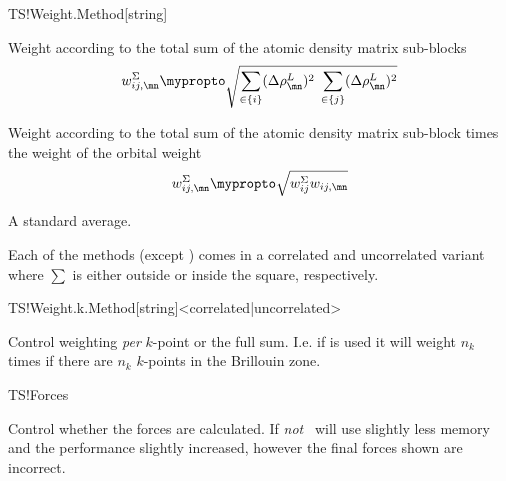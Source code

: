 \begin{fdfentry}{TS!Weight.Method}[string]
\begin{fdfoptions}
    
    Weight according to the total sum of the atomic density matrix
    sub-blocks
    \begin{equation}
      w_{ij,\mn}^{\Sigma} \mypropto
      \sqrt{
          \sum_{\in\{i\}}(\Delta\rho_{\mn}^L)^2
          \; %
          \sum_{\in\{j\}}(\Delta\rho_{\mn}^L)^2
      }
    \end{equation}

    
    Weight according to the total sum of the atomic density matrix
    sub-block times the weight of the orbital weight
    \begin{equation}
      w_{ij,\mn}^{\Sigma} \mypropto
      \sqrt{
          w_{ij}^{\Sigma} 
          w_{ij,\mn}
      }
    \end{equation}

    \option[mean]%
    
    A standard average.
    
  \end{fdfoptions}


  Each of the methods (except ) comes in a correlated and
  uncorrelated variant where $\sum$ is either outside or inside the
  square, respectively.

\end{fdfentry}

\begin{fdfentry}{TS!Weight.k.Method}[string]<correlated|uncorrelated>

  Control weighting \emph{per} $k$-point or the full sum. I.e. if
   is used it will weight $n_k$ times if there are
  $n_k$ $k$-points in the Brillouin zone.
  
\end{fdfentry}

\begin{fdflogicalT}{TS!Forces}
  
  Control whether the forces are calculated. If \emph{not} \tsiesta\
  will use slightly less memory and the performance slightly
  increased, however the final forces shown are incorrect.

\end{fdflogicalT}

